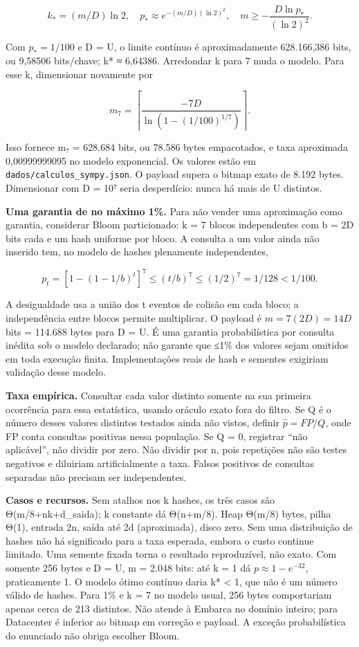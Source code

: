 \documentclass[
  brazilian,
  11pt,
  a4paper,
]{article}
\begin{document}
\[k_*=(m/D)\ln2,\quad p_*\approx e^{-(m/D)(\ln2)^2},\quad
m\ge-\frac{D\ln p_*}{(\ln2)^2}.\]

Com \(p_*=1/100\) e D = U, o limite contínuo é aproximadamente
628.166,386 bits, ou 9,58506 bits/chave; k* ≈ 6,64386. Arredondar k para
7 muda o modelo. Para esse k, dimensionar novamente por

\[m_7=\left\lceil\frac{-7D}{\ln(1-(1/100)^{1/7})}\right\rceil.\]

Isso fornece m₇ = 628.684 bits, ou 78.586 bytes empacotados, e taxa
aproximada 0,00999999095 no modelo exponencial. Os valores estão em
\texttt{dados/\allowbreak{}calculos\_\allowbreak{}sympy.\allowbreak{}json}.
O payload supera o bitmap exato de 8.192 bytes. Dimensionar com D = 10⁷
seria desperdício: nunca há mais de U distintos.

\textbf{Uma garantia de no máximo 1\%.} Para não vender uma aproximação
como garantia, considerar Bloom particionado: k = 7 blocos independentes
com b = 2D bits cada e um hash uniforme por bloco. A consulta a um valor
ainda não inserido tem, no modelo de hashes plenamente independentes,

\[p_t=\left[1-(1-1/b)^t\right]^7
\le(t/b)^7\le(1/2)^7=1/128<1/100.\]

A desigualdade usa a união dos t eventos de colisão em cada bloco; a
independência entre blocos permite multiplicar. O payload é
\(m=7(2D)=14D\) bits = 114.688 bytes para D = U. É uma garantia
probabilística por consulta inédita sob o modelo declarado; não garante
que ≤1\% dos valores sejam omitidos em toda execução finita.
Implementações reais de hash e sementes exigiriam validação desse
modelo.

\textbf{Taxa empírica.} Consultar cada valor distinto somente na sua
primeira ocorrência para essa estatística, usando oráculo exato fora do
filtro. Se Q é o número desses valores distintos testados ainda não
vistos, definir \(\widehat p=FP/Q\), onde FP conta consultas positivas
nessa população. Se Q = 0, registrar ``não aplicável'', não dividir por
zero. Não dividir por n, pois repetições não são testes negativos e
diluiriam artificialmente a taxa. Falsos positivos de consultas
separadas não precisam ser independentes.

\textbf{Casos e recursos.} Sem atalhos nos k hashes, os três casos são
Θ(m/8+nk+d\_saida); k constante dá Θ(n+m/8). Heap Θ(m/8) bytes, pilha
Θ(1), entrada 2n, saída até 2d (aproximada), disco zero. Sem uma
distribuição de hashes não há significado para a taxa esperada, embora o
custo continue limitado. Uma semente fixada torna o resultado
reproduzível, não exato. Com somente 256 bytes e D = U, m = 2.048 bits:
até k = 1 dá \(p\approx1-e^{-32}\), praticamente 1. O modelo ótimo
contínuo daria k* \textless{} 1, que não é um número válido de hashes.
Para 1\% e k = 7 no modelo usual, 256 bytes comportariam apenas cerca de
213 distintos. Não atende à Embarca no domínio inteiro; para Datacenter
é inferior ao bitmap em correção e payload. A exceção probabilística do
enunciado não obriga escolher Bloom.
\end{document}
